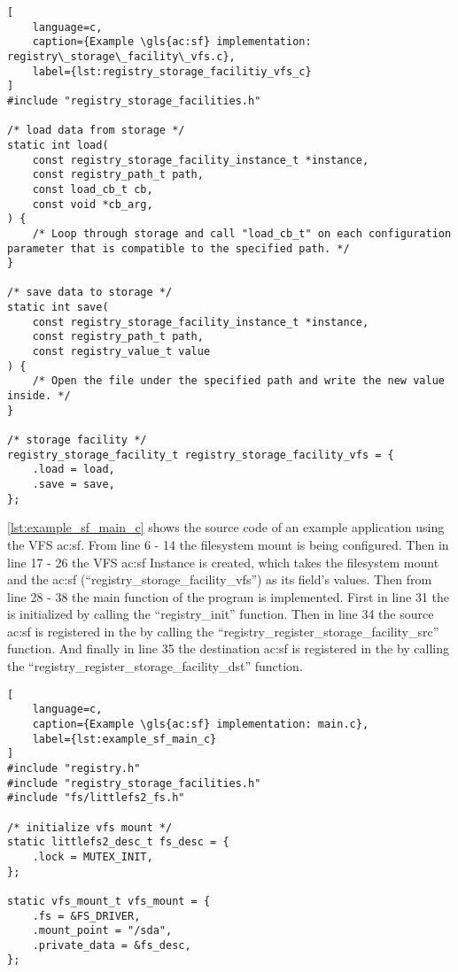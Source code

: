 {\begin{lstlisting}[
    language=c,
    caption={Example \gls{ac:sf} implementation: registry\_storage\_facility\_vfs.c},
    label={lst:registry_storage_facilitiy_vfs_c}
]
#include "registry_storage_facilities.h"

/* load data from storage */
static int load(
    const registry_storage_facility_instance_t *instance,
    const registry_path_t path,
    const load_cb_t cb,
    const void *cb_arg,
) {
    /* Loop through storage and call "load_cb_t" on each configuration parameter that is compatible to the specified path. */
}

/* save data to storage */
static int save(
    const registry_storage_facility_instance_t *instance,
    const registry_path_t path,
    const registry_value_t value
) {
    /* Open the file under the specified path and write the new value inside. */
}

/* storage facility */
registry_storage_facility_t registry_storage_facility_vfs = {
    .load = load,
    .save = save,
};
\end{lstlisting}

\autoref{lst:example_sf_main_c} shows the source code of an example application using the VFS \gls{ac:sf}.
From line 6 - 14 the filesystem mount is being configured.
Then in line 17 - 26 the VFS \gls{ac:sf} Instance is created, which takes the filesystem mount and the \gls{ac:sf} (``registry\_storage\_facility\_vfs'') as its field's values.
Then from line 28 - 38 the main function of the program is implemented.
First in line 31 the  is initialized by calling the ``registry\_init'' function.
Then in line 34 the source \gls{ac:sf} is registered in the  by calling the ``registry\_register\_storage\_facility\_src'' function. And finally in line 35 the destination \gls{ac:sf} is registered in the  by calling the ``registry\_register\_storage\_facility\_dst'' function.

\begin{lstlisting}[
    language=c,
    caption={Example \gls{ac:sf} implementation: main.c},
    label={lst:example_sf_main_c}
]
#include "registry.h"
#include "registry_storage_facilities.h"
#include "fs/littlefs2_fs.h"

/* initialize vfs mount */
static littlefs2_desc_t fs_desc = {
    .lock = MUTEX_INIT,
};

static vfs_mount_t vfs_mount = {
    .fs = &FS_DRIVER,
    .mount_point = "/sda",
    .private_data = &fs_desc,
};


\end{lstlisting}}
